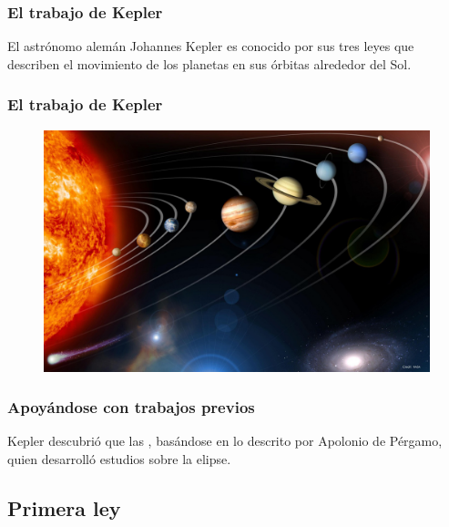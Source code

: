\documentclass[14pt]{beamer}
\begin{document}
\begin{frame}
\frametitle{El trabajo de Kepler}
El astrónomo alemán Johannes Kepler es conocido por sus tres leyes que describen el movimiento de los planetas en sus órbitas alrededor del Sol.
\end{frame}
\begin{frame}
\frametitle{El trabajo de Kepler}
\begin{figure}
    \centering
    \includegraphics[scale=0.25]{Imagenes/Kepler_01.jpg}
\end{figure}
\end{frame}
\begin{frame}
\frametitle{Apoyándose con trabajos previos}
Kepler descubrió que las , \pause basándose en lo descrito por Apolonio de Pérgamo, quien desarrolló estudios sobre la elipse.
\end{frame}

\subsection{Primera ley}
\end{document}
